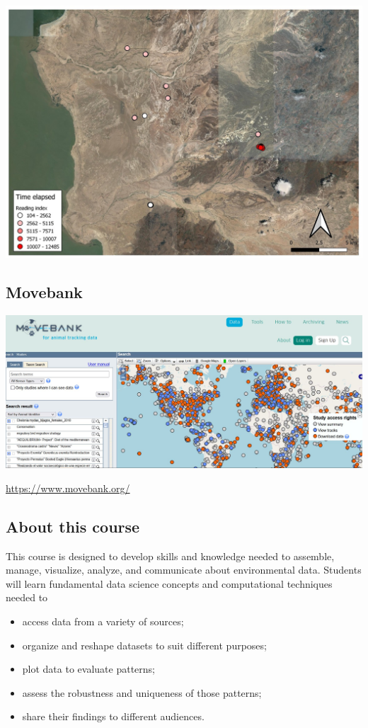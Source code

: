 \documentclass[
  letterpaper,
  DIV=11,
  numbers=noendperiod]{scrartcl}
\begin{document}
\includegraphics{InClassStatic/camps.jpg}

\hypertarget{movebank}{%
\subsection{Movebank}\label{movebank}}

\includegraphics{InClassStatic/movebank.JPG}

\url{https://www.movebank.org/}

\hypertarget{about-this-course}{%
\subsection{About this course}\label{about-this-course}}

This course is designed to develop skills and knowledge needed to
assemble, manage, visualize, analyze, and communicate about
environmental data. Students will learn fundamental data science
concepts and computational techniques needed to

\begin{itemize}
\item
  access data from a variety of sources;
\item
  organize and reshape datasets to suit different purposes;
\item
  plot data to evaluate patterns;
\item
  assess the robustness and uniqueness of those patterns;
\item
  share their findings to different audiences.
\end{itemize}
\end{document}
